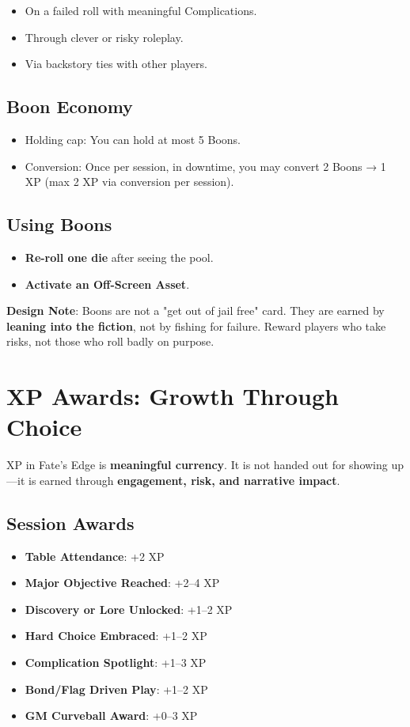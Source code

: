 \begin{itemize}
    \item On a failed roll with meaningful Complications.
    \item Through clever or risky roleplay.
    \item Via backstory ties with other players.
\end{itemize}

\subsection*{Boon Economy}

\begin{itemize}
    \item Holding cap: You can hold at most 5 Boons.
    \item Conversion: Once per session, in downtime, you may convert 2 Boons → 1 XP (max 2 XP via conversion per session).
\end{itemize}

\subsection*{Using Boons}

\begin{itemize}
    \item \textbf{Re-roll one die} after seeing the pool.
    \item \textbf{Activate an Off-Screen Asset}.
\end{itemize}

\textbf{Design Note}: Boons are not a "get out of jail free" card. They are earned by \textbf{leaning into the fiction}, not by fishing for failure. Reward players who take risks, not those who roll badly on purpose.

\section*{XP Awards: Growth Through Choice}

XP in Fate's Edge is \textbf{meaningful currency}. It is not handed out for showing up—it is earned through \textbf{engagement, risk, and narrative impact}.

\subsection*{Session Awards}

\begin{itemize}
    \item \textbf{Table Attendance}: +2 XP
    \item \textbf{Major Objective Reached}: +2–4 XP
    \item \textbf{Discovery or Lore Unlocked}: +1–2 XP
    \item \textbf{Hard Choice Embraced}: +1–2 XP
    \item \textbf{Complication Spotlight}: +1–3 XP
    \item \textbf{Bond/Flag Driven Play}: +1–2 XP
    \item \textbf{GM Curveball Award}: +0–3 XP
\end{itemize}

